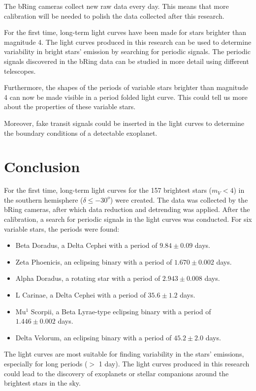 \documentclass{aa}
\begin{document}
The bRing cameras collect new raw data every day. This means that more calibration will be needed to polish the data collected after this research.

For the first time, long-term light curves have been made for stars brighter than magnitude 4. The light curves produced in this research can be used to determine variability in bright stars' emission by searching for periodic signals. The periodic signals discovered in the bRing data can be studied in more detail using different telescopes.

Furthermore, the shapes of the periods of variable stars brighter than magnitude 4 can now be made visible in a period folded light curve. This could tell us more about the properties of these variable stars.

Moreover, fake transit signals could be inserted in the light curves to determine the boundary conditions of a detectable exoplanet. 



\section{Conclusion}
\label{sec:conclusion}
For the first time, long-term light curves for the 157 brightest stars ($m_V < 4$) in the southern hemisphere ($\delta \leq -30^o$) were created.
The data was collected by the bRing cameras, after which data reduction and detrending was applied. After the calibration, a search for periodic signals in the light curves was conducted. For six variable stars, the periods were found: 
\begin{itemize}
    \item Beta Doradus, a Delta Cephei with a period of $9.84 \pm 0.09$ days.
    \item Zeta Phoenicis, an eclipsing binary with a period of $1.670 \pm 0.002$ days.
    \item Alpha Doradus, a rotating star with a period of $2.943 \pm 0.008$ days.
    \item L Carinae, a Delta Cephei with a period of $35.6 \pm 1.2$ days.
    \item Mu$^1$ Scorpii, a Beta Lyrae-type eclipsing binary with a period of $1.446 \pm 0.002$ days.
    \item Delta Velorum, an eclipsing binary with a period of $45.2 \pm 2.0$ days.
\end{itemize}
The light curves are most suitable for finding variability in the stars' emissions, especially for long periods ($>$ 1 day). The light curves produced in this research could lead to the discovery of exoplanets or stellar companions around the brightest stars in the sky.
\end{document}
